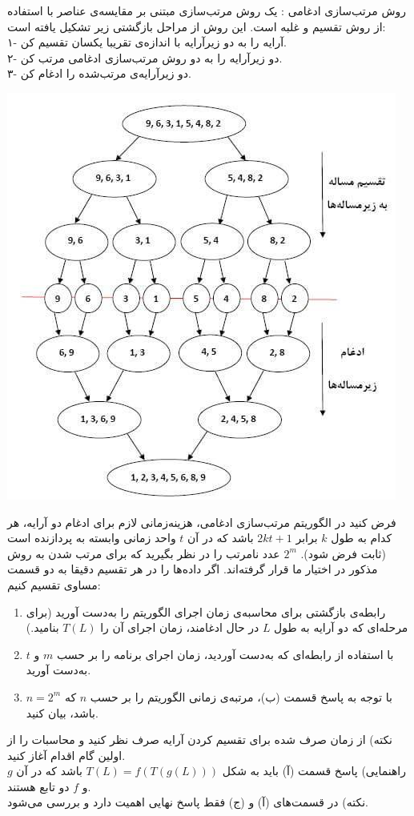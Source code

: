 \EXERCISE
روش مرتب‌سازی ادغامی
: یک روش مرتب‌سازی مبتنی بر مقایسه‌ی عناصر با استفاده از روش تقسیم و غلبه است. این روش از مراحل بازگشتی زیر تشکیل یافته است:
\\
۱- آرایه را به دو زیرآرایه با اندازه‌ی تقریبا یکسان تقسیم کن.
\\
۲- دو زیرآرایه را به دو روش مرتب‌سازی ادغامی مرتب کن.
\\
۳- دو زیرآرایه‌ی مرتب‌شده را ادغام کن.
\begin{center}
\includegraphics[scale=0.5]{./7.png}
\end{center}
فرض کنید در الگوریتم مرتب‌سازی ادغامی، هزینه‌زمانی لازم برای ادغام دو آرایه، هر کدام به طول
$k$
برابر
$2kt + 1$
باشد که در آن
$t$
واحد زمانی وابسته به پردازنده است (ثابت فرض شود).
$2^m$
عدد نامرتب را در نظر بگیرید که برای مرتب شدن به روش مذکور در اختیار ما قرار گرفته‌اند. اگر داده‌ها را در هر تقسیم دقیقا به دو قسمت مساوی تقسیم کنیم:
\begin{enumerate}
\item
رابطه‌ی بازگشتی برای محاسبه‌ی زمان اجرای الگوریتم را به‌دست آورید (برای مرحله‌ای که دو آرایه به طول
$L$
در حال ادغامند، زمان اجرای آن را 
$T(L)$
بنامید.)
\item
با استفاده از رابطه‌ای که به‌دست آوردید، زمان اجرای برنامه را بر حسب
$m$
و
$t$
به‌دست آورید.
\item
با توجه به پاسخ قسمت (ب)، مرتبه‌ی زمانی الگوریتم را بر حسب
$n$
که
$n = 2^m$
باشد، بیان کنید.

\end{enumerate}
نکته) از زمان صرف شده برای تقسیم کردن آرایه صرف نظر کنید و محاسبات را از اولین گام اقدام آغاز کنید.
\\
راهنمایی) پاسخ قسمت (آ) باید به شکل
$T(L) = f(T(g(L)))$
باشد که در آن
$g$
و
$f$
دو تابع هستند.
\\
نکته) در قسمت‌های (آ) و (ج) فقط پاسخ نهایی اهمیت دارد و بررسی می‌شود.